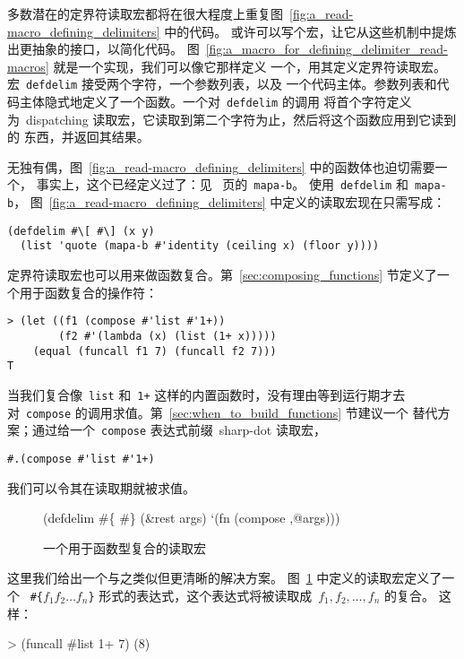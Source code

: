 多数潜在的定界符读取宏都将在很大程度上重复图~\ref{fig:a_read-macro_defining_delimiters} 中的代码。
或许可以写个宏，让它从这些机制中提炼出更抽象的接口，以简化代码。
图~\ref{fig:a_macro_for_defining_delimiter_read-macros} 就是一个实现，我们可以像它那样定义
一个\utility{}，用其定义定界符读取宏。宏~\verb|defdelim| 接受两个字符，一个参数列表，以及
一个代码主体。参数列表和代码主体隐式地定义了一个函数。一个对~\verb|defdelim| 的调用
将首个字符定义为~dispatching 读取宏，它读取到第二个字符为止，然后将这个函数应用到它读到的
东西，并返回其结果。

无独有偶，图~\ref{fig:a_read-macro_defining_delimiters} 中的函数体也迫切需要一个\utility{}，
事实上，这个\utility{}已经定义过了：见~\pageref{fig:mapping_functions} 页的~\verb|mapa-b|。
使用~\verb|defdelim| 和~\verb|mapa-b|，
图~\ref{fig:a_read-macro_defining_delimiters} 中定义的读取宏现在只需写成：
\begin{lstlisting}
(defdelim #\[ #\] (x y)
  (list 'quote (mapa-b #'identity (ceiling x) (floor y))))
\end{lstlisting}

定界符读取宏也可以用来做函数复合。第~\ref{sec:composing_functions}
节定义了一个用于函数复合的操作符：
\begin{lstlisting}
> (let ((f1 (compose #'list #'1+))
        (f2 #'(lambda (x) (list (1+ x)))))
    (equal (funcall f1 7) (funcall f2 7)))
T
\end{lstlisting}
当我们复合像~\verb|list| 和~\verb|1+| 这样的内置函数时，没有理由等到运行期才去
对~\verb|compose| 的调用求值。第~\ref{sec:when_to_build_functions} 节建议一个
替代方案；通过给一个~\verb|compose| 表达式前缀~sharp-dot 读取宏，
\begin{lstlisting}
#.(compose #'list #'1+)
\end{lstlisting}
我们可以令其在读取期就被求值。

\begin{figure}
\begin{lisp}
(defdelim #\{ #\} (&rest args)
  `(fn (compose ,@args)))
\end{lisp}
  \caption{一个用于函数型复合的读取宏}
  \label{fig:a_read-macro_for_functional_composition}
\end{figure}

这里我们给出一个与之类似但更清晰的解决方案。
图~\ref{fig:a_read-macro_for_functional_composition} 中定义的读取宏定义了一个
~\texttt{\#\{$f_1f_2\ldots f_n$\}} 形式的表达式，这个表达式将被读取成~$f_1,f_2,\ldots,f_n$ 的复合。
这样：
\begin{lisp}
> (funcall #{list 1+} 7)
(8)
\end{lisp}

